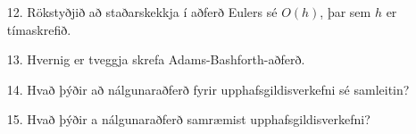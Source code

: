 \documentclass[icelandic,a4paper,12pt]{article}
\begin{document}
  \begin{enumerate}
  \item [12.]  Rökstyðjið að staðarskekkja í aðferð Eulers sé $O(h)$,
    þar sem $h$ er tímaskrefið.
  \item [13.] Hvernig er tveggja skrefa Adams-Bashforth-aðferð.
  \item [14.] Hvað þýðir að nálgunaraðferð fyrir upphafsgildisverkefni
    sé samleitin?
  \item [15.] Hvað þýðir a nálgunaraðferð samræmist upphafsgildisverkefni?
   \end{enumerate}
\end{document}
